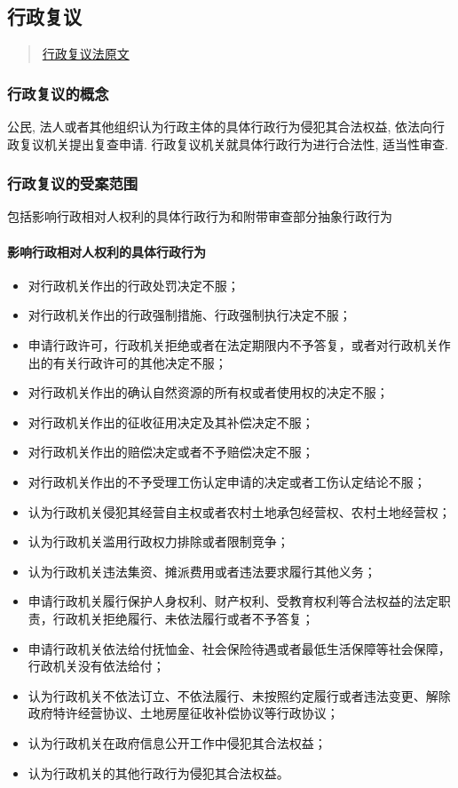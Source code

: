 \subsection{行政复议}

\begin{quote}
    \href{https://www.gov.cn/yaowen/liebiao/202309/content_6901584.htm}{行政复议法原文}
\end{quote}

\subsubsection{行政复议的概念} 公民, 法人或者其他组织认为行政主体的具体行政行为侵犯其合法权益, 依法向行政复议机关提出复查申请. 行政复议机关就具体行政行为进行合法性, 适当性审查.

\subsubsection{行政复议的受案范围} 包括影响行政相对人权利的具体行政行为和附带审查部分抽象行政行为

\paragraph{影响行政相对人权利的具体行政行为}

\begin{itemize}
    \item 对行政机关作出的行政处罚决定不服；
    \item 对行政机关作出的行政强制措施、行政强制执行决定不服；
    \item 申请行政许可，行政机关拒绝或者在法定期限内不予答复，或者对行政机关作出的有关行政许可的其他决定不服；
    \item 对行政机关作出的确认自然资源的所有权或者使用权的决定不服；
    \item 对行政机关作出的征收征用决定及其补偿决定不服；
    \item 对行政机关作出的赔偿决定或者不予赔偿决定不服；
    \item 对行政机关作出的不予受理工伤认定申请的决定或者工伤认定结论不服；
    \item 认为行政机关侵犯其经营自主权或者农村土地承包经营权、农村土地经营权；
    \item 认为行政机关滥用行政权力排除或者限制竞争；
    \item 认为行政机关违法集资、摊派费用或者违法要求履行其他义务；
    \item 申请行政机关履行保护人身权利、财产权利、受教育权利等合法权益的法定职责，行政机关拒绝履行、未依法履行或者不予答复；
    \item 申请行政机关依法给付抚恤金、社会保险待遇或者最低生活保障等社会保障，行政机关没有依法给付；
    \item 认为行政机关不依法订立、不依法履行、未按照约定履行或者违法变更、解除政府特许经营协议、土地房屋征收补偿协议等行政协议；
    \item 认为行政机关在政府信息公开工作中侵犯其合法权益；
    \item 认为行政机关的其他行政行为侵犯其合法权益。
\end{itemize}


